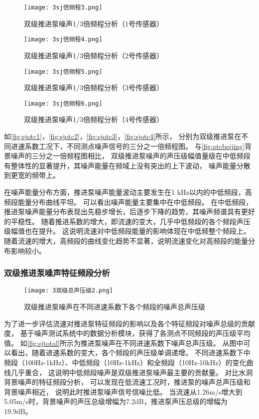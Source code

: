 \begin{figure}[htbp]
    \centering
    \texttt{[image: 3sj倍频程3.png]}
    \caption{\label{fig:sjotc1}双级推进泵噪声1/3倍频程分析（1号传感器）}
\end{figure}
\begin{figure}[htbp]
    \centering
    \texttt{[image: 3sj倍频程4.png]}
    \caption{\label{fig:sjotc2}双级推进泵噪声1/3倍频程分析（2号传感器）}
\end{figure}
\begin{figure}[htbp]
    \centering
    \texttt{[image: 3sj倍频程5.png]}
    \caption{\label{fig:sjotc3}双级推进泵噪声1/3倍频程分析（3号传感器）}
\end{figure}
\begin{figure}[htbp]
    \centering
    \texttt{[image: 3sj倍频程6.png]}
    \caption{\label{fig:sjotc4}双级推进泵噪声1/3倍频程分析（4号传感器）}
\end{figure}

如\autoref{fig:sjotc1}，\autoref{fig:sjotc2}，\autoref{fig:sjotc3}，\autoref{fig:sjotc4}所示，
分别为双级推进泵在不同进速系数工况下，不同测点噪声信号的三分之一倍频程图。
与\autoref{fig:otcbeijing}背景噪声的三分之一倍频程图相比，
双级推进泵噪声的声压级幅值量级在中低频段有整体性的显著提升，其噪声能量在频域上没有突出的上下波动，
噪声能量分散到更宽的频带上。

在噪声能量分布方面，推进泵噪声能量波动主要发生在1 kHz以内的中低频段，高频段能量分布曲线平坦。
可以看出噪声能量主要集中在中低频段。
在中低频段，推进泵噪声能量分布表现出先稳步增长，后逐步下降的趋势，其噪声频谱具有更好的平稳性。
随着推进系数的增大，即流速的变大，几乎中低频段的各个频段声压级幅值也在提升。
这说明流速对中低频段能量的影响体现在中低频整个频段上。
随着流速的增大，高频段的曲线变化趋势不显著，说明流速变化对高频段的能量分布影响较小。

\subsubsection{双级推进泵噪声特征频段分析}
\begin{figure}[htbp]
    \centering
    \texttt{[image: 3双级总声压级2.png]}
    \caption{\label{fig:sjtotal}双级推进泵噪声在不同进速系数下各个频段的噪声总声压级}
\end{figure}

为了进一步评估流速对推进泵特征频段的影响以及各个特征频段对噪声总级的贡献度，
基于噪声测试系统中的数据分析模块，获得了各测点不同频段的声压级平均值。
如\autoref{fig:sjtotal}所示为推进泵噪声在不同进速系数下噪声总声压级。
从图中可以看出，随着进速系数的变大，各个频段的声压级单调递增。
不同进速系数下中频段（100Hz-1kHz）、中低频段（10Hz-1kHz）和全频段（10Hz-10kHz）的变化曲线几乎重合，
这说明中低频段噪声是双级推进泵噪声最主要的贡献量。
对比水洞背景噪声的特征频段分析，
可以发现在低流速工况时，推进泵的噪声总声压级和背景噪声相近，
说明此时推进泵噪声信号信噪比低。
当流速从1.26m/s增大到5.05m/s时，背景噪声的声压总级增幅为7.2dB，推进泵声压总级的增幅为19.9dB。

